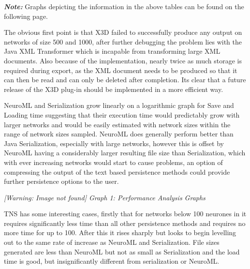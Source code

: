 \documentclass[12pt,twoside]{article}
\begin{document}
\bigskip

{\upshape
\textbf{\textit{Note:}} Graphs depicting the information in the above
tables can be found on the following page.}


\bigskip

{\upshape
The obvious first point is that X3D failed to successfully produce any
output on networks of size 500 and 1000, after further debugging the
problem lies with the Java XML Transformer which is incapable from
transforming large XML documents. Also because of the implementation,
nearly twice as much storage is required during export, as the XML
document needs to be produced so that it can then be read and can only
be deleted after completion. Its clear that a future release of the X3D
plug{}-in should be implemented in a more efficient way.}


\bigskip

{\upshape
NeuroML and Serialization grow linearly on a logarithmic graph for Save
and Loading time suggesting that their execution time would predictably
grow with larger networks and would be easily estimated with network
sizes within the range of network sizes sampled. NeuroML does generally
perform better than Java Serialization, especially with large networks,
however this is offset by NeuroML having a considerably larger
resulting file size than Serialization, which with ever increasing
networks would start to cause problems, an option of compressing the
output of the text based persistence methods could provide further
persistence options to the user.}

\clearpage{\mdseries\upshape
}

\begin{center}
\begin{minipage}{17cm}
{\raggedleft\itshape
 [Warning: Image not found] Graph 1: Performance Analysis Graphs
\par}
\end{minipage}\end{center}
{\mdseries\upshape
TNS has some interesting cases, firstly that for networks below 100
neurones in it requires significantly less time than all other
persistence methods and requires no more time for up to 100. After this
it rises sharply but looks to begin levelling out to the same rate of
increase as NeuroML and Serialization. File sizes generated are less
than NeuroML but not as small as Serialization and the load time is
good, but insignificantly different from serialization or NeuroML.}


\bigskip
\end{document}
